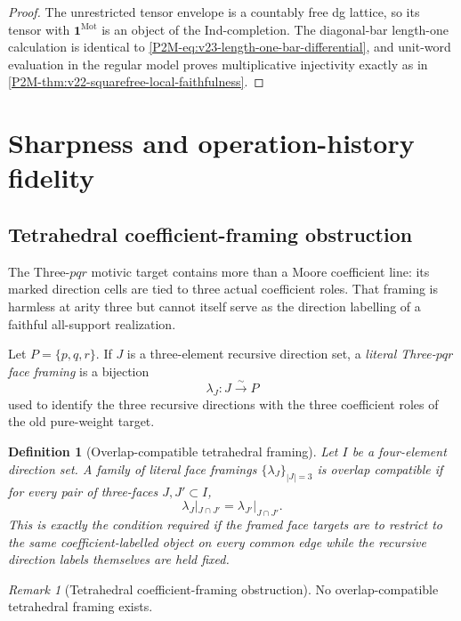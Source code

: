 \documentclass[11pt]{article}
\newtheorem{definition}[theorem]{Definition}
\theoremstyle{remark}
\newtheorem{remark}[theorem]{Remark}
\newcommand{\Mot}{\mathrm{Mot}}
\begin{document}
\begin{proof}
The unrestricted tensor envelope is a countably free dg lattice, so its tensor
with $\mathbf1^{\Mot}$ is an object of the Ind-completion.  The diagonal-bar
length-one calculation is identical to
\eqref{P2M-eq:v23-length-one-bar-differential}, and unit-word evaluation in the
regular model proves multiplicative injectivity exactly as in
\cref{P2M-thm:v22-squarefree-local-faithfulness}.
\end{proof}


\section{Sharpness and operation-history fidelity}

\subsection{Tetrahedral coefficient-framing obstruction}

The Three-\(pqr\) motivic target contains more than a Moore coefficient line:
its marked direction cells are tied to three actual coefficient roles.  That
framing is harmless at arity three but cannot itself serve as the direction labelling of a faithful all-support realization.

Let \(P=\{p,q,r\}\).  If \(J\) is a three-element recursive direction set, a
\emph{literal Three-\(pqr\) face framing} is a bijection
\[
 \lambda_J:J\xrightarrow{\sim}P
\]
used to identify the three recursive directions with the three coefficient
roles of the old pure-weight target.

\begin{definition}[Overlap-compatible tetrahedral framing]
\label{P2M-def:compatible-triad-framing}
Let \(I\) be a four-element direction set.  A family of literal face framings
\(\{\lambda_J\}_{|J|=3}\) is \emph{overlap compatible} if for every pair of
three-faces \(J,J'\subset I\),
\[
 \lambda_J|_{J\cap J'}=\lambda_{J'}|_{J\cap J'}.
\]
This is exactly the condition required if the framed face targets are to
restrict to the same coefficient-labelled object on every common edge while
the recursive direction labels themselves are held fixed.
\end{definition}

\begin{remark}[Tetrahedral coefficient-framing obstruction]
\label{P2M-thm:triad-framing-nogo}
No overlap-compatible tetrahedral framing exists.
\end{remark}
\end{document}
